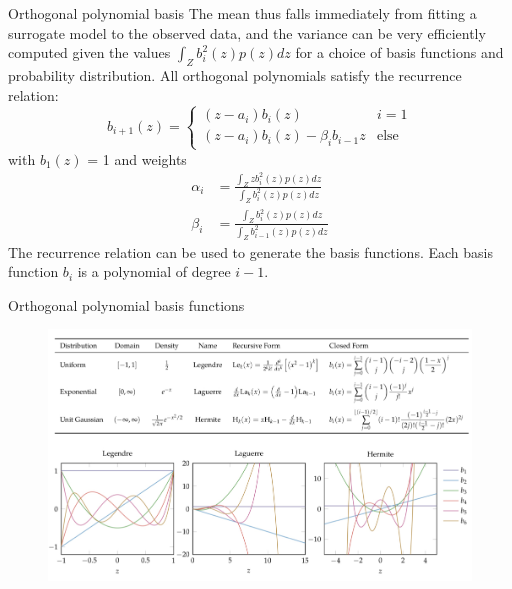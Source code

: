 \documentclass{beamer}
\begin{document}
\begin{frame}{Orthogonal polynomial basis}
The mean thus falls immediately from fitting a surrogate model to the observed data, and the variance can be very efficiently computed given the values $\int_Z b_i^2(z)p(z)dz$ for a choice of basis functions and probability distribution. All orthogonal polynomials satisfy the recurrence relation:
\begin{equation*}
    b_{i+1}(z) = 
    \begin{cases}
    (z-a_i)b_i(z) & i=1\\
    (z-a_i)b_i(z) - \beta_i b_{i-1}z & {\textrm{else}}
    \end{cases}
\end{equation*}
with $b_1(z)$ = 1 and weights
\begin{equation*}
    \begin{split}
    \alpha_i &= \frac{\int_Z z b_i^2(z)p(z)dz} {\int_Z b_i^2(z)p(z)dz}\\
    \beta_i &= \frac{\int_Z b_i^2(z)p(z)dz}{\int_Z b_{i-1}^2(z)p(z)dz}      
    \end{split}
\end{equation*}
The recurrence relation can be used to generate the basis functions. Each basis function $b_i$ is a polynomial of degree $i-1$. 

\end{frame}

\begin{frame}{Orthogonal polynomial basis functions}
\begin{figure}
\centering
\includegraphics[width=120mm]{Figs/orthogonal.jpeg}
\end{figure} 
\end{frame}
\end{document}

